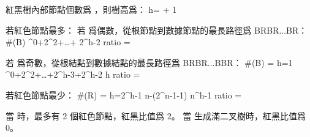 \startANSWER
紅黑樹內部節點個數爲 ，則樹高爲：
\startformula
h=\lfloor {} \rfloor + 1
\stopformula

若紅色節點最多：
\startigBase[a]
\startitem
若  爲偶數，從根節點到數據節點的最長路徑爲 BRBR...BR：
\startformula\startmathalignment
\NC \#(B) ^0+2^2+\ldots + 2^{h-2} \NR
\NC ratio \NC =  \NR
\stopmathalignment\stopformula
\stopitem

\startitem
若  爲奇數，從根結點到數據結點的最長路徑爲 BRBR...BBR：
\startformula\startmathalignment
\NC \#(B) \NC = \startmathcases
{}		\MC h=1 \NR
{}^0+2^2+\ldots +2^{h-3}+2^{h-2}	\MC h \NR
\stopmathcases \NR
\NC ratio \NC =  \NR
\stopmathalignment\stopformula
\stopitem
\stopigBase

若紅色節點最少：
\startformula\startmathalignment
\NC \#(R) \NC = \startmathcases
{}		\MC h=2^h-1 \NR
\NC n-(2^{n-1}-1)	\MC n^h-1 \NR
\stopmathcases \NR
\NC ratio \NC =  \NR
\stopmathalignment\stopformula

當  時，最多有 2 個紅色節點，紅黑比值爲 2。
當  生成滿二叉樹時，紅黑比值爲 0。
\stopANSWER
\stopsection
